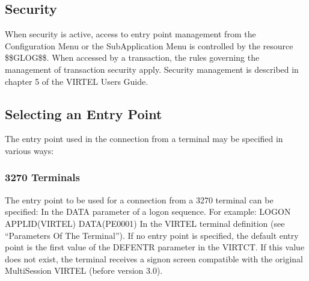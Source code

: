 \documentclass[letterpaper,10pt,english]{sphinxmanual}
\begin{document}
\ignorespaces 

\subsection{Security}
\label{\detokenize{connectivity_guide:index-107}}\label{\detokenize{connectivity_guide:id57}}
\sphinxAtStartPar
When security is active, access to entry point management from the Configuration Menu or the Sub\sphinxhyphen{}Application Menu is controlled by the resource \$\$GLOG\$\$. When accessed by a transaction, the rules governing the management of transaction security apply. Security management is described in chapter 5 of the VIRTEL Users Guide.

\ignorespaces 

\subsection{Selecting an Entry Point}
\label{\detokenize{connectivity_guide:selecting-an-entry-point}}\label{\detokenize{connectivity_guide:index-108}}
\sphinxAtStartPar
The entry point used in the connection from a terminal may be specified in various ways:


\subsubsection{3270 Terminals}
\label{\detokenize{connectivity_guide:id58}}
\sphinxAtStartPar
The entry point to be used for a connection from a 3270 terminal can be specified:
\sphinxhyphen{} In the DATA parameter of a logon sequence. For example: LOGON APPLID(VIRTEL) DATA(PE\sphinxhyphen{}0001)
\sphinxhyphen{} In the VIRTEL terminal definition (see “Parameters Of The Terminal”).
\sphinxhyphen{} If no entry point is specified, the default entry point is the first value of the DEFENTR parameter in the VIRTCT. If this value does not exist, the terminal receives a signon screen compatible with the original Multi\sphinxhyphen{}Session VIRTEL (before version 3.0).
\end{document}

